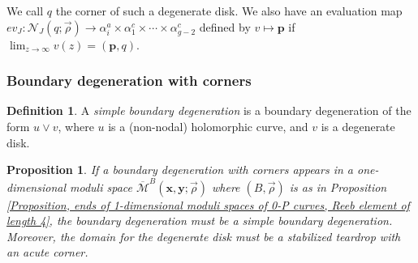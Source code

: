\documentclass{amsart}
\newtheorem{prop}[thm]{Proposition}
\theoremstyle{definition}
\newtheorem{defn}[thm]{Definition}
\theoremstyle{remark}
\numberwithin{equation}{section}
\numberwithin{equation}{section} \makeatletter
\begin{document}
We call $q$ the corner of such a degenerate disk. We also have an evaluation map $ev_J:\mathcal{N}_J(q;\overrightarrow{\rho})\rightarrow \alpha^a_i\times\alpha_1^c\times\cdots\times \alpha_{g-2}^c$ defined by $v\mapsto \bm{p}$ if $\lim_{z\rightarrow \infty}v(z)=(\bm{p},q)$.

\subsubsection{Boundary degeneration with corners}
\begin{defn}
A \emph{simple boundary degeneration} is a boundary degeneration of the form $u\vee v$, where $u$ is a (non-nodal) holomorphic curve, and $v$ is a degenerate disk. 
\end{defn}

\begin{prop}\label{Proposition, boundary degeneration with corner must be of simple form}
If a boundary degeneration with corners appears in a one-dimensional moduli space $\overline{\mathcal{M}}^B(\bm{x},\bm{y};\overrightarrow{\rho})$ where $(B,\overrightarrow{\rho} )$ is as in Proposition \ref{Proposition, ends of 1-dimensional moduli spaces of 0-P curves, Reeb element of length 4}, the boundary degeneration must be a simple boundary degeneration. Moreover, the domain for the degenerate disk must be a stabilized teardrop with an acute corner. 
\end{prop}
\end{document}
